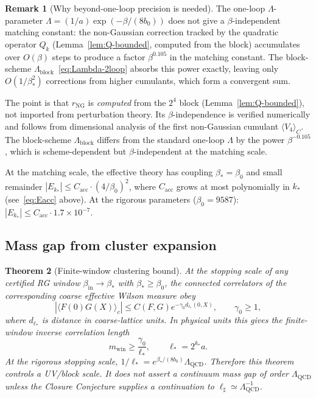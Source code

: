 \documentclass[11pt]{article}
\newtheorem{theorem}{Theorem}[section]
\theoremstyle{definition}
\newtheorem{remark}[theorem]{Remark}
\newcommand{\Lam}{\Lambda_{\mathrm{QCD}}}
\begin{document}
\begin{remark}[Why beyond-one-loop precision is needed]%
\label{rem:lambda-scheme}
The one-loop $\Lambda$-parameter
$\Lambda=(1/a)\exp(-\beta/(8b_0))$ does not give a
$\beta$-independent matching constant: the non-Gaussian
correction tracked by the quadratic operator $Q_k$ (Lemma~\ref{lem:Q-bounded},
computed from the block) accumulates over $O(\beta)$ steps
to produce a factor $\beta^{0.105}$ in the matching constant.
The block-scheme $\Lambda_{\mathrm{block}}$~\eqref{eq:Lambda-2loop}
absorbs this power exactly, leaving only $O(1/\beta_*^2)$
corrections from higher cumulants, which form a convergent sum.

The point is that $r_{\mathrm{NG}}$ is \emph{computed}
from the $2^4$ block (Lemma~\ref{lem:Q-bounded}), not imported
from perturbation theory.  Its $\beta$-independence is
verified numerically and follows from dimensional analysis
of the first non-Gaussian cumulant $\langle V_4\rangle_C$.
The block-scheme $\Lambda_{\mathrm{block}}$ differs from the
standard one-loop $\Lambda$ by the power $\beta^{-0.105}$,
which is scheme-dependent but $\beta$-independent at the
matching scale.
\end{remark}

At the matching scale, the effective theory has coupling $\beta_*=\beta_0$
and small remainder $|E_{k_*}|\le C_{\mathrm{acc}}\cdot(4/\beta_0)^2$,
where $C_{\mathrm{acc}}$ grows at most polynomially in $k_*$
(see~\eqref{eq:Eacc} above).
At the rigorous parameters ($\beta_0=9587$):
$|E_{k_*}|\le C_{\mathrm{acc}}\cdot 1.7\times 10^{-7}$.

\subsection{Mass gap from cluster expansion}


\begin{theorem}[Finite-window clustering bound]\label{thm:massgap}
At the stopping scale of any certified RG window
$\beta_{\mathrm{in}}\to\beta_*$ with $\beta_*\ge\beta_0$, the connected
correlators of the corresponding coarse effective Wilson measure obey
\begin{equation}\label{eq:mgap}
|\langle F(0)G(X)\rangle_c|
\le C(F,G)e^{-\gamma_0 d_{\ell_*}(0,X)},
\qquad \gamma_0\ge 1,
\end{equation}
where $d_{\ell_*}$ is distance in coarse-lattice units.  In physical
units this gives the finite-window inverse correlation length
\begin{equation}\label{eq:mgap-phys}
 m_{\mathrm{win}}\ge \frac{\gamma_0}{\ell_*},
 \qquad
 \ell_*=2^{k_*}a.
\end{equation}
At the rigorous stopping scale,
$1/\ell_*=e^{\beta_*/(8b_0)}\Lam$.  Therefore this theorem controls a
UV/block scale.  It does not assert a continuum mass gap of order
$\Lam$ unless the Closure Conjecture supplies a continuation to
$\ell_\sharp\simeq\Lam^{-1}$.
\end{theorem}
\end{document}
